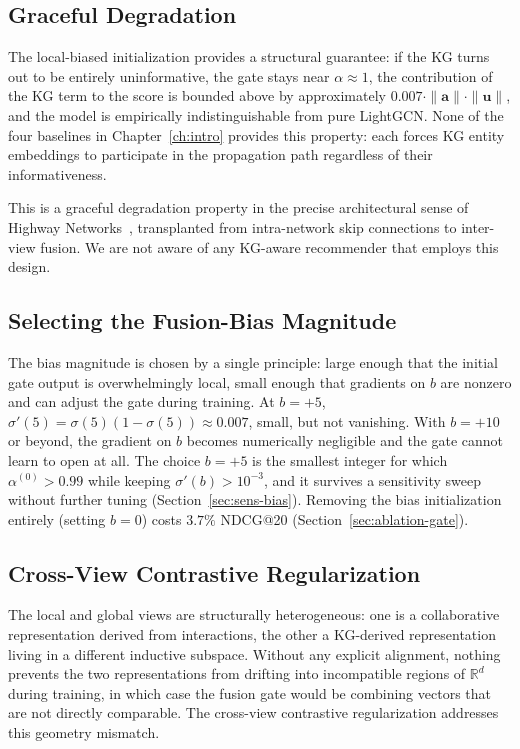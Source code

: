 \subsection{Graceful Degradation}
\label{sec:gate-degrade}

The local-biased initialization provides a structural guarantee: if the KG turns out to be entirely uninformative, the gate stays near $\alpha \approx 1$, the contribution of the KG term to the score is bounded above by approximately $0.007 \cdot \|\mathbf{a}\| \cdot \|\mathbf{u}\|$, and the model is empirically indistinguishable from pure LightGCN. None of the four baselines in Chapter~\ref{ch:intro} provides this property: each forces KG entity embeddings to participate in the propagation path regardless of their informativeness.

This is a graceful degradation property in the precise architectural sense of Highway Networks~\cite{srivastava2015highway}, transplanted from intra-network skip connections to inter-view fusion. We are not aware of any KG-aware recommender that employs this design.

\subsection{Selecting the Fusion-Bias Magnitude}
\label{sec:gate-bias-magnitude}

The bias magnitude is chosen by a single principle: large enough that the initial gate output is overwhelmingly local, small enough that gradients on $b$ are nonzero and can adjust the gate during training. At $b = +5$, $\sigma'(5) = \sigma(5)(1 - \sigma(5)) \approx 0.007$, small, but not vanishing. With $b = +10$ or beyond, the gradient on $b$ becomes numerically negligible and the gate cannot learn to open at all. The choice $b = +5$ is the smallest integer for which $\alpha^{(0)} > 0.99$ while keeping $\sigma'(b) > 10^{-3}$, and it survives a sensitivity sweep without further tuning (Section~\ref{sec:sens-bias}). Removing the bias initialization entirely (setting $b = 0$) costs $3.7\%$ NDCG@20 (Section~\ref{sec:ablation-gate}).

\subsection{Cross-View Contrastive Regularization}
\label{sec:cl}

The local and global views are structurally heterogeneous: one is a collaborative representation derived from interactions, the other a KG-derived representation living in a different inductive subspace. Without any explicit alignment, nothing prevents the two representations from drifting into incompatible regions of $\mathbb{R}^d$ during training, in which case the fusion gate would be combining vectors that are not directly comparable. The cross-view contrastive regularization addresses this geometry mismatch.

